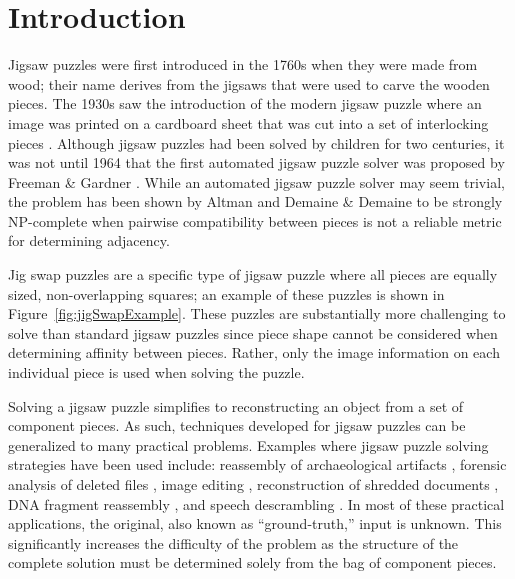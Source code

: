 \chapter{Introduction}\label{sec:introduction}

Jigsaw puzzles were first introduced in the 1760s when they were made from wood; their name derives from the jigsaws that were used to carve the wooden pieces.   The 1930s saw the introduction of the modern jigsaw puzzle where an image was printed on a cardboard sheet that was cut into a set of interlocking pieces \cite{williams1990, williams2004}.  Although jigsaw puzzles had been solved by children for two centuries, it was not until 1964 that the first automated jigsaw puzzle solver was proposed by Freeman \& Gardner \cite{freeman1964}.  While an automated jigsaw puzzle solver may seem trivial, the problem has been shown by Altman \cite{altman1990} and Demaine \& Demaine \cite{demaine2007} to be strongly NP-complete when pairwise compatibility between pieces is not a reliable metric for determining adjacency.

Jig swap puzzles are a specific type of jigsaw puzzle where all pieces are equally sized, non-overlapping squares; an example of these puzzles is shown in Figure~\ref{fig:jigSwapExample}.  These puzzles are substantially more challenging to solve than standard jigsaw puzzles since piece shape cannot be considered when determining affinity between pieces.  Rather, only the image information on each individual piece is used when solving the puzzle.  

Solving a jigsaw puzzle simplifies to reconstructing an object from a set of component pieces.  As such, techniques developed for jigsaw puzzles can be generalized to many practical problems.  Examples where jigsaw puzzle solving strategies have been used include: reassembly of archaeological artifacts \cite{brown2008, koller2006}, forensic analysis of deleted files \cite{garfinkel2010}, image editing \cite{cho2008}, reconstruction of shredded documents \cite{zhu2008}, DNA fragment reassembly \cite{marande2007}, and speech descrambling \cite{zhao2007}.  In most of these practical applications, the original, also known as ``ground-truth,'' input is unknown.  This significantly increases the difficulty of the problem as the structure of the complete solution must be determined solely from the bag of component pieces.


